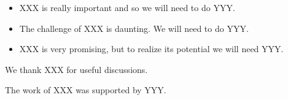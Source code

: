 \documentclass[twocolumn]{svjour3}
\begin{document}
\begin{itemize}

\item XXX is really important and so we will need to do YYY.

\item The challenge of XXX is daunting. We will need to do YYY.

\item XXX is very promising, but to realize its potential we will need
YYY.

\end{itemize}


\begin{acknowledgements}

We thank XXX for useful discussions.

The work of XXX was supported by YYY.

\end{acknowledgements}




\end{document}
